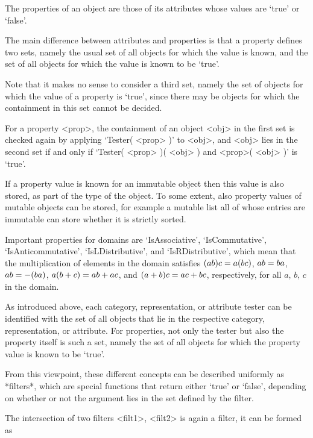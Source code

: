 The properties of an object are those of its attributes whose values are
`true' or `false'.

The main difference between attributes and properties is that a property
defines two sets,
namely the usual set of all objects for which the value is known,
and the set of all objects for which the value is known to be `true'.

Note that it makes no sense to consider a third set, namely the set of
objects for which the value of a property is `true', since there may be
objects for which the containment in this set cannot be decided.

For a property <prop>, the containment of an object <obj> in the first
set is checked again by applying `Tester( <prop> )' to <obj>,
and <obj> lies in the second set if and only if
`Tester( <prop> )( <obj> ) and <prop>( <obj> )' is `true'.

If a property value is known for an immutable object then this value is
also stored, as part of the type of the object.
To some extent, also property values of mutable objects can be stored,
for example a mutable list all of whose entries are immutable can store
whether it is strictly sorted.

Important properties for domains are `IsAssociative', `IsCommutative',
`IsAnticommutative', `IsLDistributive', and `IsRDistributive',
which mean that the multiplication of elements in the domain satisfies
$(a \* b ) \* c = a \* ( b \* c )$, $a \* b = b \* a$,
$a \* b = - ( b \* a )$, $a \* ( b + c ) = a \* b + a \* c$,
and $( a + b ) \* c = a \* c + b \* c$, respectively,
for all $a$, $b$, $c$ in the domain.


As introduced above, each category, representation, or attribute tester
can be identified with the set of all objects that lie in the respective
category, representation, or attribute.
For properties, not only the tester but also the property itself is such
a set,
namely the set of all objects for which the property value is known to be
`true'.

{}From this viewpoint, these different concepts can be described
uniformly as *filters*,
which are special {\GAP} functions that return either `true' or `false',
depending on whether or not the argument lies in the set defined by the
filter.

The intersection of two filters <filt1>, <filt2> is again a filter,
it can be formed as

